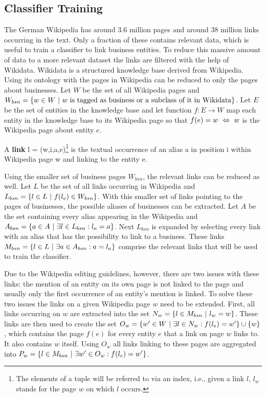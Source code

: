 \subsection{Classifier Training}
The German Wikipedia has around 3.6 million pages and around 38 million links occurring in the text. Only a fraction of these contains relevant data, which is useful to train a classifier to link business entities. To reduce this massive amount of data to a more relevant dataset the links are filtered with the help of Wikidata. Wikidata is a structured knowledge base derived from Wikipedia. Using its ontology with the pages in Wikipedia can be reduced to only the pages about businesses. Let $W$ be the set of all Wikipedia pages and $W_{bsn} = \{ w \in W {\mbox{ }|\mbox{ }} w \text{ is tagged as business or a subclass of it in Wikidata} \}$. Let $E$ be the set of entities in the knowledge base and let function $f: E \to W$ map each entity in the knowledge base to its Wikipedia page so that $f(e) = w {\mbox{ }\Leftrightarrow\mbox{ }} w$ is the Wikipedia page about entity $e$.
\begin{definition}
A \textbf{link} l = (w,i,a,e)\footnote{The elements of a tuple will be referred to via an index, i.e., given a link $l$, $l_w$ stands for the page $w$ on which $l$ occurs. } is the textual occurrence of an alias a in position i within Wikipedia page w and linking to the entity e.
\label{link}
\end{definition}
Using the smaller set of business pages $W_{bsn}$, the relevant links can be reduced as well. Let $L$ be the set of all links occurring in Wikipedia and $L_{bsn} = \{ l \in L {\mbox{ }|\mbox{ }} f(l_e) \in W_{bsn} \}$. With this smaller set of links pointing to the pages of businesses, the possible aliases of businesses can be extracted. Let $A$ be the set containing every alias appearing in the Wikipedia and $A_{bsn} = \{ a \in A {\mbox{ }|\mbox{ }} \exists l \in L_{bsn}: l_a = a \}$. Next $L_{bsn}$ is expanded by selecting every link with an alias that has the possibility to link to a business. These links $M_{bsn} = \{ l \in L {\mbox{ }|\mbox{ }} \exists a \in A_{bsn}: a = l_a \}$ comprise the relevant links that will be used to train the classifier.\par
Due to the Wikipedia editing guidelines, however, there are two issues with these links: the mention of an entity on its own page is not linked to the page and usually only the first occurrence of an entity's mention is linked. To solve these two issues the links on a given Wikipedia page $w$ need to be extended. First, all links occurring on $w$ are extracted into the set $N_w = \{ l \in M_{bsn} {\mbox{ }|\mbox{ }} l_w = w\}$. These links are then used to create the set $O_w = \{ w' \in W {\mbox{ }|\mbox{ }} \exists l \in N_w: f(l_e) = w' \} \cup \{ w \}$, which contains the page $f(e)$ for every entity $e$ that a link on page $w$ links to. It also contains $w$ itself. Using $O_w$ all links linking to these pages are aggregated into $P_w = \{ l \in M_{bsn} {\mbox{ }|\mbox{ }} \exists w' \in O_w: f(l_e) = w' \}$.\par
